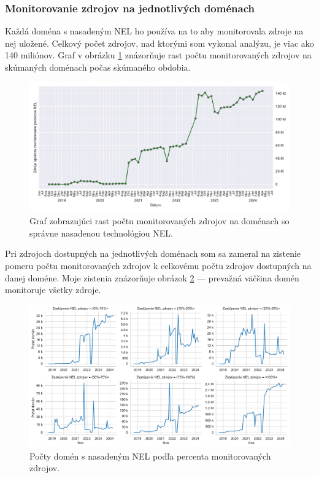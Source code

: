 \subsubsection{Monitorovanie zdrojov na jednotlivých doménach}

Každá doména s nasadeným NEL ho používa na to aby monitorovala zdroje na nej uložené.
Celkový počet zdrojov, nad ktorými som vykonal analýzu, je viac ako 140 miliónov.
Graf v obrázku \ref{fig:httparchive-nel-deployment-resources} znázorňuje rast počtu monitorovaných zdrojov na skúmaných doménach počas skúmaného obdobia.

\begin{figure}[!htb]
\begin{center}
 \includegraphics[scale=0.59]{obrazky-figures/httparchive_nel_deployment_resources.pdf}
 \caption{\centering Graf zobrazujúci rast počtu monitorovaných zdrojov na doménach so správne nasadenou technológiou NEL.}
 \label{fig:httparchive-nel-deployment-resources}
\end{center}
\end{figure}

Pri zdrojoch dostupných na jednotlivých doménach som sa zameral na zistenie pomeru počtu monitorovaných zdrojov k celkovému počtu zdrojov dostupných na danej doméne.
Moje zistenia znázorňuje obrázok \ref{fig:httparchive-nel-monitored-resources-precentage-dist} --- prevažná väčšina domén monitoruje všetky zdroje.

\begin{figure}[!htb]
\begin{center}
 \includegraphics[scale=0.56]{obrazky-figures/httparchive_nel_monitored_resources_percentage_dist.pdf}
 \caption{\centering Počty domén s nasadeným NEL podľa percenta monitorovaných zdrojov.}
 \label{fig:httparchive-nel-monitored-resources-precentage-dist}
\end{center}
\end{figure}

